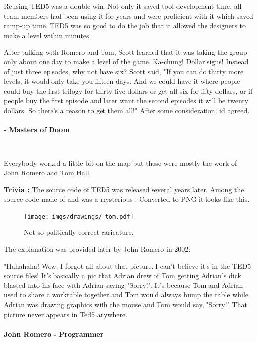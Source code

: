 \documentclass[book.tex]{subfiles}
\begin{document}
Reusing TED5 was a double win. Not only it saved tool development time, all team members had been using it for years and were proficient with it which saved ramp-up time. TED5 was so good to do the job that it allowed the designers to make a level within minutes.\\
\par

 \begin{fancyquotes}
After talking with Romero and Tom, Scott learned that it was taking the group only about one day to make a level of the game. Ka-chung! Dollar signs! Instead of just three episodes, why not have six? Scott said, "If you can do thirty more levels, it would only take you fifteen days. And we could have it where people could buy the first trilogy for thirty-five dollars or get all six for fifty dollars, or if people buy the first episode and later want the second episodes it will be twenty dollars. So there's a reason to get them all!" After some consideration, id agreed.\\
\\
 \textbf{- Masters of Doom}
 \end{fancyquotes}\\

\par
Everybody worked a little bit on the map but those were mostly the work of John Romero and Tom Hall.\\
\par
 \textbf{\underline{Trivia :}} The source code of TED5 was released several years later. Among the source code made of  and  was a mysterious . Converted to PNG it looks like this.\\
\begin{figure}[H]
\centering
 \texttt{[image: imgs/drawings/\_tom.pdf]}
 \caption{Not so politically correct caricature.} 
 \end{figure}
The explanation was provided later by John Romero in 2002:\\
\par
 \begin{fancyquotes}
   "Hahahaha! Wow, I forgot all about that picture. I can't believe it's 
in the TED5 source files! It's basically a pic that Adrian drew of Tom 
getting Adrian's dick blasted into his face with Adrian saying "Sorry!". 
It's because Tom and Adrian used to share a worktable together and Tom 
would always bump the table while Adrian was drawing graphics with the 
mouse and Tom would say, "Sorry!" That picture never appears in Ted5 
anywhere.\\
   \\
\textbf{John Romero - Programmer}
 \end{fancyquotes}\\
\end{document}
